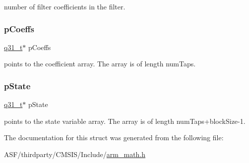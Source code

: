 number of filter coefficients in the filter. \mbox{\label{structarm__fir__instance__q31_a68888e36167d81cb7836db10367a1682}} 
\subsubsection{\texorpdfstring{pCoeffs}{pCoeffs}}
{\footnotesize\ttfamily \mbox{\hyperlink{arm__math_8h_adc89a3547f5324b7b3b95adec3806bc0}{q31\+\_\+t}}$\ast$ p\+Coeffs}

points to the coefficient array. The array is of length num\+Taps. \mbox{\label{structarm__fir__instance__q31_adee4ba3ee8869865af7d8fa08ca913d6}} 
\subsubsection{\texorpdfstring{pState}{pState}}
{\footnotesize\ttfamily \mbox{\hyperlink{arm__math_8h_adc89a3547f5324b7b3b95adec3806bc0}{q31\+\_\+t}}$\ast$ p\+State}

points to the state variable array. The array is of length num\+Taps+block\+Size-\/1. 

The documentation for this struct was generated from the following file\+:\begin{DoxyCompactItemize}
\item 
A\+S\+F/thirdparty/\+C\+M\+S\+I\+S/\+Include/\mbox{\hyperlink{arm__math_8h}{arm\+\_\+math.\+h}}\end{DoxyCompactItemize}

